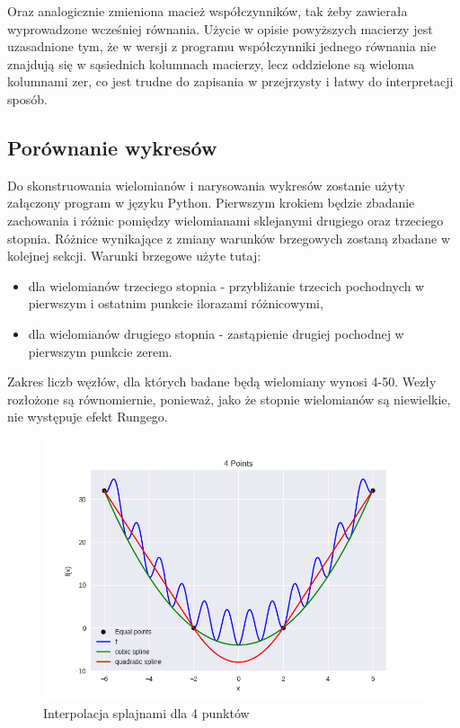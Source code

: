 \documentclass{article}
\begin{document}
Oraz analogicznie zmieniona macież współczynników, tak żeby zawierała wyprowadzone wcześniej równania.
Użycie w opisie powyższych macierzy jest uzasadnione tym, że w wersji z programu współczynniki
jednego równania nie znajdują się w sąsiednich kolumnach macierzy, lecz oddzielone są wieloma kolumnami
zer, co jest trudne do zapisania w przejrzysty i łatwy do interpretacji sposób.  

\subsection{Porównanie wykresów}
Do skonstruowania wielomianów i narysowania wykresów zostanie użyty załączony program w języku Python.
Pierwszym krokiem będzie zbadanie zachowania i różnic pomiędzy wielomianami sklejanymi drugiego oraz trzeciego 
stopnia. Różnice wynikające z zmiany warunków brzegowych zostaną zbadane w kolejnej sekcji. Warunki brzegowe użyte tutaj:
\begin{itemize}
    \item
    dla wielomianów trzeciego stopnia - przybliżanie trzecich pochodnych w pierwszym i ostatnim punkcie ilorazami różnicowymi,
    \item
    dla wielomianów drugiego stopnia - zastąpienie drugiej pochodnej w pierwszym punkcie zerem.
\end{itemize}

Zakres liczb węzłów, dla których badane będą wielomiany wynosi 4-50. Wezły rozłożone są równomiernie, ponieważ, 
jako że stopnie wielomianów są niewielkie, nie występuje efekt Rungego.

\begin{figure}[H]
    \centering
    \includegraphics[width=\textwidth]{img/spline_4.png}
    \caption{Interpolacja splajnami dla 4 punktów}
\end{figure}
\end{document}
